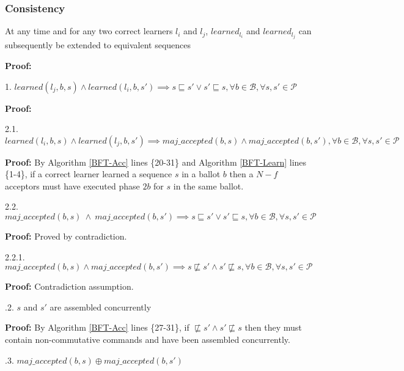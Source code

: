 \subsubsection{Consistency}
\begin{theorem}At any time and for any two correct learners $l_i$ and $l_j$, $learned_{l_i}$ and $learned_{l_j}$ can subsequently be extended to equivalent sequences \par
\end{theorem} 
\textbf{Proof:} \par
1. $learned(l_j,b,s) \land learned(l_i,b,s') \implies s \sqsubseteq s' \lor s' \sqsubseteq s, \forall b \in \mathcal{B}, \forall s,s' \in \mathcal{P}$ \par
\indent\indent\textbf{Proof:} \par
\indent\indent\indent\parbox{\linewidth}{2.1. $learned(l_i,b,s) \land learned(l_j,b,s') \implies maj\_accepted(b,s) \land maj\_accepted(b,s'), \forall b \in \mathcal{B}, \forall s,s' \in \mathcal{P}$ } \par
\indent\indent\indent\indent\parbox{\linewidth}{\textbf{Proof:} By Algorithm \ref{BFT-Acc} lines \{20-31\} and Algorithm \ref{BFT-Learn} lines \{1-4\}, if a correct learner learned a sequence $s$ in a ballot $b$ then a $N-f$ acceptors must have executed phase $2b$ for $s$ in the same ballot.}\par
\indent\indent\indent\parbox{\linewidth}{2.2. $maj\_accepted(b,s)\ \land\ maj\_accepted(b,s') \implies s \sqsubseteq s' \lor s' \sqsubseteq s, \forall b \in \mathcal{B}, \forall s,s' \in \mathcal{P}$}\par
\indent\indent\indent\indent\textbf{Proof:} Proved by contradiction.\par
\indent\indent\indent\indent\indent\parbox{\linewidth}{2.2.1. $maj\_accepted(b,s) \land maj\_accepted(b,s') \implies s \not\sqsubseteq s' \land s' \not\sqsubseteq s, \forall b \in \mathcal{B}, \forall s,s' \in \mathcal{P}$} \par
\indent\indent\indent\indent\indent\indent\textbf{Proof:} Contradiction assumption.\par
\indent\indent\indent\indent{}.2. $s$ and $s'$ are assembled concurrently \par
\indent\indent\indent\indent\indent\indent \parbox{\linewidth}{\textbf{Proof:} By Algorithm \ref{BFT-Acc} lines \{27-31\}, if $\not\sqsubseteq s' \land s' \not\sqsubseteq s$ then they must contain non-commutative commands and have been assembled concurrently.}\par
\indent\indent\indent\indent{}.3. $maj\_accepted(b,s) \oplus maj\_accepted(b,s')$ \par
